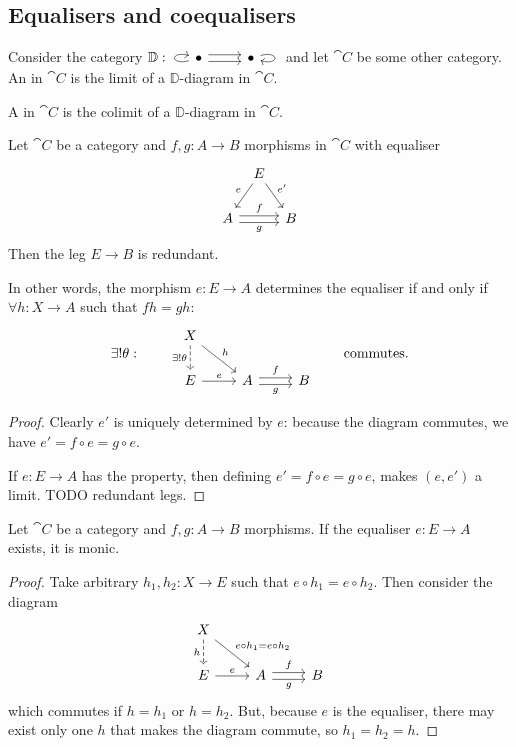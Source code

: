 \subsection{Equalisers and coequalisers}
\begin{definition}
Consider the category $\mathbb{D}: \begin{tikzcd}
\bullet \ar[loop left] \ar[r, shift left] \ar[r, shift right] & \bullet \ar[loop right]
\end{tikzcd}$ and let $\cat{C}$ be some other category. An  in $\cat{C}$ is the limit of a $\mathbb{D}$-diagram in $\cat{C}$.

A  in $\cat{C}$ is the colimit of a $\mathbb{D}$-diagram in $\cat{C}$.
\end{definition}

\begin{lemma}
Let $\cat{C}$ be a category and $f,g: A\to B$ morphisms in $\cat{C}$ with equaliser
\[ \begin{tikzcd}[column sep=tiny]
& E \ar[dl, swap, "e"] \ar[dr, "{e'}"] & \\
A \ar[rr, shift left, "f"] \ar[rr, shift right, swap, "g"] && B
\end{tikzcd} \]
Then the leg $E\to B$ is redundant.
\end{lemma}
In other words, the morphism $e: E\to A$ determines the equaliser \textup{if and only if} $\forall h: X\to A$ such that $fh = gh$:
\[ \exists! \theta : \qquad \begin{tikzcd}
X \ar[d, dashed, swap, "{\exists! \theta}"] \ar[dr, "h"] && \\
E \ar[r, "e"] & A \ar[r, shift left, "f"] \ar[r, shift right, swap, "g"] & B
\end{tikzcd} \qquad \text{commutes.} \]
\begin{proof}
Clearly $e'$ is uniquely determined by $e$: because the diagram commutes, we have $e' = f\circ e = g\circ e$.

If $e: E\to A$ has the property, then defining $e' = f\circ e = g\circ e$, makes $(e,e')$ a limit. TODO redundant legs.
\end{proof}

\begin{lemma} \label{equaliserMonic}
Let $\cat{C}$ be a category and $f,g: A\to B$ morphisms. If the equaliser $e: E\to A$ exists, it is monic.
\end{lemma}
\begin{proof}
Take arbitrary $h_1, h_2: X\to E$ such that $e\circ h_1 = e\circ h_2$. Then consider the diagram
\[ \begin{tikzcd}
X \ar[d, dashed, swap, "h"] \ar[dr, "{e\circ h_1 = e\circ h_2}"] && \\
E \ar[r, "e"] & A \ar[r, shift left, "f"] \ar[r, shift right, swap, "g"] & B
\end{tikzcd} \]
which commutes if $h = h_1$ or $h = h_2$. But, because $e$ is the equaliser, there may exist only one $h$ that makes the diagram commute, so $h_1 = h_2 = h$.
\end{proof}

